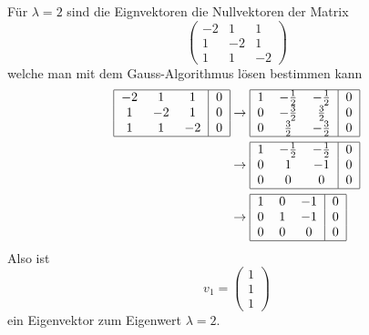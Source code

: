 \begin{loesung}
Für $\lambda=2$ sind die Eignvektoren die Nullvektoren der Matrix
\[
\begin{pmatrix}
-2&1&1\\
1&-2&1\\
1&1&-2
\end{pmatrix}
\]
welche man mit dem Gauss-Algorithmus lösen bestimmen kann
\begin{align*}
\begin{tabular}{|ccc|c|}
\hline
$-2$&1&1&0\\
1&$-2$&1&0\\
1&1&$-2$&0\\
\hline
\end{tabular}
&\rightarrow
\begin{tabular}{|ccc|c|}
\hline
1&$-\frac12$&$-\frac12$&0\\
0&$-\frac32$&$\frac32$&0\\
0&$\frac32$&$-\frac32$&0\\
\hline
\end{tabular}
\\
&\rightarrow
\begin{tabular}{|ccc|c|}
\hline
1&$-\frac12$&$-\frac12$&0\\
0&1&$-1$&0\\
0&0&0&0\\
\hline
\end{tabular}
\\
&\rightarrow
\begin{tabular}{|ccc|c|}
\hline
1&0&$-1$&0\\
0&1&$-1$&0\\
0&0&0&0\\
\hline
\end{tabular}
\end{align*}
Also ist
\[
v_1=\begin{pmatrix}1\\1\\1\end{pmatrix}
\]
ein Eigenvektor zum Eigenwert $\lambda=2$.


\end{loesung}
